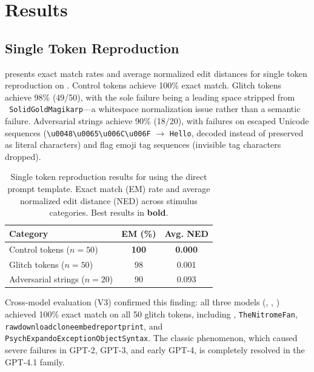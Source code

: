 \section{Results}
\label{sec:results}

\subsection{Single Token Reproduction}

 presents exact match rates and average normalized edit distances for single token reproduction on \gptfull. Control tokens achieve 100\% exact match. Glitch tokens achieve 98\% (49/50), with the sole failure being a leading space stripped from \texttt{\ SolidGoldMagikarp}---a whitespace normalization issue rather than a semantic failure. Adversarial strings achieve 90\% (18/20), with failures on escaped Unicode sequences (\texttt{\textbackslash u0048\textbackslash u0065\textbackslash u006C\textbackslash u006F} $\rightarrow$ \texttt{Hello}, decoded instead of preserved as literal characters) and flag emoji tag sequences (invisible tag characters dropped).

\begin{table}[t]
    \centering
    \caption{Single token reproduction results for \gptfull using the direct prompt template. Exact match (EM) rate and average normalized edit distance (NED) across stimulus categories. Best results in \textbf{bold}.}
    \label{tab:token_results}
    \begin{tabular}{@{}lcc@{}}
        \toprule
        \textbf{Category} & \textbf{EM (\%)} & \textbf{Avg. NED} \\
        \midrule
        Control tokens ($n=50$) & \textbf{100} & \textbf{0.000} \\
        Glitch tokens ($n=50$) & 98 & 0.001 \\
        Adversarial strings ($n=20$) & 90 & 0.093 \\
        \bottomrule
    \end{tabular}
\end{table}

Cross-model evaluation (V3) confirmed this finding: all three models (\gptfull, \gptmini, \gptomini) achieved 100\% exact match on all 50 glitch tokens, including \magikarp, \texttt{TheNitromeFan}, \texttt{rawdownloadcloneembedreportprint}, and \texttt{PsychExpandoExceptionObjectSyntax}. The classic \glitchtoken phenomenon, which caused severe failures in GPT-2, GPT-3, and early GPT-4, is completely resolved in the GPT-4.1 family.

